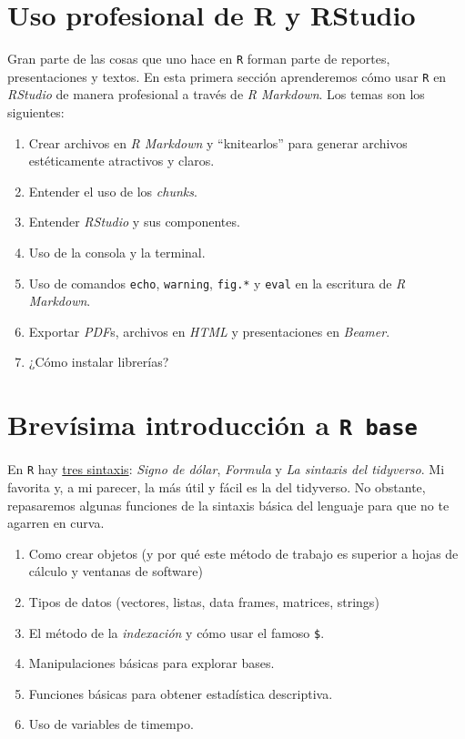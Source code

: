 \documentclass[]{article}
\providecommand{\tightlist}{%
  \setlength{\itemsep}{0pt}\setlength{\parskip}{0pt}}
\begin{document}
\section{Uso profesional de R y
RStudio}\label{uso-profesional-de-r-y-rstudio}

Gran parte de las cosas que uno hace en \texttt{R} forman parte de
reportes, presentaciones y textos. En esta primera sección aprenderemos
cómo usar \texttt{R} en \emph{RStudio} de manera profesional a través de
\emph{R Markdown}. Los temas son los siguientes:

\begin{enumerate}
\def\labelenumi{\arabic{enumi}.}
\tightlist
\item
  Crear archivos en \emph{R Markdown} y ``knitearlos'' para generar
  archivos estéticamente atractivos y claros.
\item
  Entender el uso de los \emph{chunks}.
\item
  Entender \emph{RStudio} y sus componentes.
\item
  Uso de la consola y la terminal.
\item
  Uso de comandos \texttt{echo}, \texttt{warning}, \texttt{fig.*} y
  \texttt{eval} en la escritura de \emph{R Markdown}.
\item
  Exportar \emph{PDF}s, archivos en \emph{HTML} y presentaciones en
  \emph{Beamer}.
\item
  ¿Cómo instalar librerías?
\end{enumerate}

\section{\texorpdfstring{Brevísima introducción a
\texttt{R\ base}}{Brevísima introducción a R base}}\label{brevisima-introduccion-a-r-base}

En \texttt{R} hay
\href{http://www.science.smith.edu/~amcnamara/Syntax-cheatsheet.pdf}{tres
sintaxis}: \emph{Signo de dólar}, \emph{Formula} y \emph{La sintaxis del
tidyverso}. Mi favorita y, a mi parecer, la más útil y fácil es la del
tidyverso. No obstante, repasaremos algunas funciones de la sintaxis
básica del lenguaje para que no te agarren en curva.

\begin{enumerate}
\def\labelenumi{\arabic{enumi}.}
\tightlist
\item
  Como crear objetos (y por qué este método de trabajo es superior a
  hojas de cálculo y ventanas de software)
\item
  Tipos de datos (vectores, listas, data frames, matrices, strings)
\item
  El método de la \emph{indexación} y cómo usar el famoso \texttt{\$}.
\item
  Manipulaciones básicas para explorar bases.
\item
  Funciones básicas para obtener estadística descriptiva.
\item
  Uso de variables de timempo.
\end{enumerate}
\end{document}
